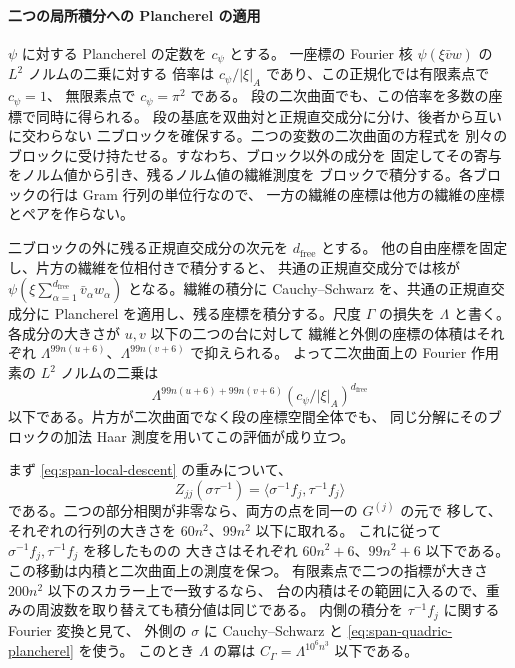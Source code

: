 \paragraph{二つの局所積分への Plancherel の適用}\label{par:span-local-plancherel}
\(\psi\) に対する Plancherel の定数を \(c_\psi\) とする。
一座標の Fourier 核 \(\psi(\xi\bar v w)\) の \(L^2\) ノルムの二乗に対する
倍率は \(c_\psi/|\xi|_A\) であり、この正規化では有限素点で \(c_\psi=1\)、
無限素点で \(c_\psi=\pi^2\) である。
段の二次曲面でも、この倍率を多数の座標で同時に得られる。
段の基底を双曲対と正規直交成分に分け、後者から互いに交わらない
二ブロックを確保する。二つの変数の二次曲面の方程式を
別々のブロックに受け持たせる。すなわち、ブロック以外の成分を
固定してその寄与をノルム値から引き、残るノルム値の繊維測度を
ブロックで積分する。各ブロックの行は Gram 行列の単位行なので、
一方の繊維の座標は他方の繊維の座標とペアを作らない。

二ブロックの外に残る正規直交成分の次元を \(d_{\mathrm{free}}\) とする。
他の自由座標を固定し、片方の繊維を位相付きで積分すると、
共通の正規直交成分では核が
\(\psi(\xi\sum_{\alpha=1}^{d_{\mathrm{free}}}\bar v_\alpha w_\alpha)\)
となる。繊維の積分に Cauchy--Schwarz を、共通の正規直交成分に
Plancherel を適用し、残る座標を積分する。尺度 \(\Gamma\) の損失を
\(\Lambda\) と書く。各成分の大きさが \(u,v\) 以下の二つの台に対して
繊維と外側の座標の体積はそれぞれ
\(\Lambda^{99n(u+6)}\)、\(\Lambda^{99n(v+6)}\) で抑えられる。
よって二次曲面上の Fourier 作用素の \(L^2\) ノルムの二乗は
\begin{equation}\label{eq:span-quadric-plancherel}
 \Lambda^{99n(u+6)+99n(v+6)}
              (c_\psi/|\xi|_A)^{d_{\mathrm{free}}}
\end{equation}
以下である。片方が二次曲面でなく段の座標空間全体でも、
同じ分解にそのブロックの加法 Haar 測度を用いてこの評価が成り立つ。

まず \eqref{eq:span-local-descent} の重みについて、
\[
 Z_{jj}(\sigma\tau^{-1})
   =\langle \sigma^{-1}f_j,\tau^{-1}f_j\rangle
\]
である。二つの部分相関が非零なら、両方の点を同一の \(G^{(j)}\) の元で
移して、それぞれの行列の大きさを \(60n^2\)、\(99n^2\) 以下に取れる。
これに従って \(\sigma^{-1}f_j,\tau^{-1}f_j\) を移したものの
大きさはそれぞれ \(60n^2+6\)、\(99n^2+6\) 以下である。
この移動は内積と二次曲面上の測度を保つ。
有限素点で二つの指標が大きさ \(200n^2\) 以下のスカラー上で一致するなら、
台の内積はその範囲に入るので、重みの周波数を取り替えても積分値は同じである。
内側の積分を \(\tau^{-1}f_j\) に関する Fourier 変換と見て、
外側の \(\sigma\) に Cauchy--Schwarz と \eqref{eq:span-quadric-plancherel} を使う。
このとき \(\Lambda\) の冪は \(C_\Gamma=\Lambda^{10^6 n^3}\) 以下である。

